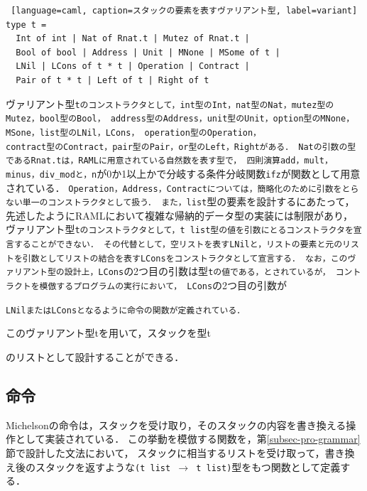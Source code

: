 \documentclass{kuisthesis}
\begin{document}
\begin{lstlisting} [language=caml, caption=スタックの要素を表すヴァリアント型, label=variant]
type t =
  Int of int | Nat of Rnat.t | Mutez of Rnat.t |
  Bool of bool | Address | Unit | MNone | MSome of t |
  LNil | LCons of t * t | Operation | Contract |
  Pair of t * t | Left of t | Right of t 
\end{lstlisting}


ヴァリアント型{\tt tのコンストラクタとして，int型のInt，nat型のNat，mutez型のMutez，bool型のBool，
address型のAddress，unit型のUnit，option型のMNone，MSone，list型のLNil，LCons，
operation型のOperation，\\contract型のContract，pair型のPair，or型のLeft，Rightがある．
Natの引数の型であるRnat.tは，RAMLに用意されている自然数を表す型で，
四則演算add，mult，minus，div\_modと，n}が0か1以上かで分岐する条件分岐関数{\tt ifz}が関数として用意されている．
{\tt Operation，Address，Contractについては，簡略化のために引数をとらない単一のコンストラクタとして扱う．
また，list}型の要素を設計するにあたって，先述したようにRAMLにおいて複雑な帰納的データ型の実装には制限があり，
ヴァリアント型{\tt tのコンストラクタとして，t list型の値を引数にとるコンストラクタを宣言することができない．
その代替として，空リストを表すLNilと，リストの要素と元のリストを引数としてリストの結合を表すLConsをコンストラクタとして宣言する．
なお，このヴァリアント型の設計上，LCons}の2つ目の引数は型{\tt tの値である，とされているが，
コントラクトを模倣するプログラムの実行において，
LCons}の2つ目の引数が{\tt LNilまたはLConsとなるように命令の関数が定義されている．

このヴァリアント型tを用いて，スタックを型t}のリストとして設計することができる．

\subsection{命令} \label{subsec-pro-instr}
Michelsonの命令は，スタックを受け取り，そのスタックの内容を書き換える操作として実装されている．
この挙動を模倣する関数を，第\ref{subsec-pro-grammar}節で設計した文法において，
スタックに相当するリストを受け取って，書き換え後のスタックを返すような{\tt (t list $\rightarrow$ t list)}型をもつ関数として定義する．
\end{document}
